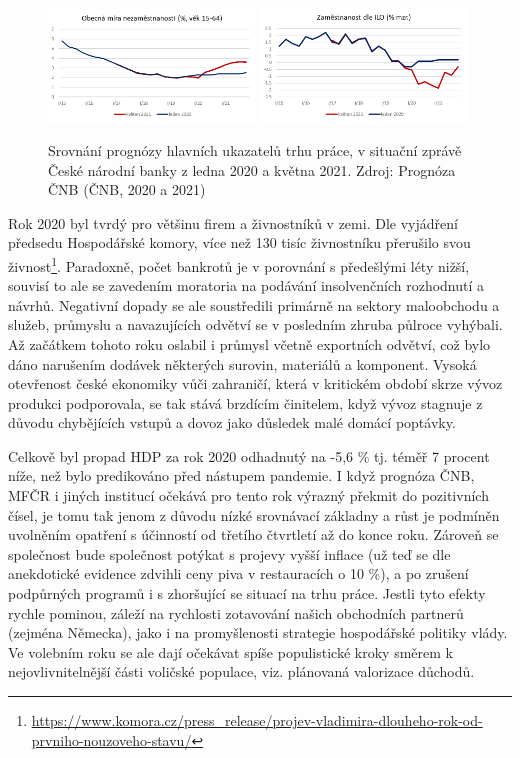 \begin{figure}[ht]
    \centering
    \includegraphics[width=0.49\textwidth]{./pic/nezamestnanost.png} \includegraphics[width=0.49\textwidth]{./pic/zamestnanost.png}
    \caption{Srovnání prognózy hlavních ukazatelů trhu práce, v situační zprávě České národní banky z ledna 2020 a května 2021. Zdroj: Prognóza ČNB (ČNB, 2020 a 2021)}
    \label{fig:110-trhprace}
\end{figure}

Rok 2020 byl tvrdý pro většinu firem a živnostníků v zemi. Dle vyjádření předsedu Hospodářské komory, více než 130 tisíc živnostníku přerušilo svou živnost\footnote{\url{https://www.komora.cz/press_release/projev-vladimira-dlouheho-rok-od-prvniho-nouzoveho-stavu/}}. Paradoxně, počet bankrotů je v porovnání s předešlými léty nižší, souvisí to ale se zavedením moratoria na podávání insolvenčních rozhodnutí a návrhů. Negativní dopady se ale soustředili primárně na sektory maloobchodu a služeb, průmyslu a navazujících odvětví se v posledním zhruba půlroce vyhýbali. Až začátkem tohoto roku oslabil i průmysl včetně exportních odvětví, což bylo dáno narušením dodávek některých surovin, materiálů a komponent. Vysoká otevřenost české ekonomiky vůči zahraničí, která v kritickém období skrze vývoz produkci podporovala, se tak stává brzdícím činitelem, když vývoz stagnuje z důvodu chybějících vstupů a dovoz jako důsledek malé domácí poptávky.

Celkově byl propad HDP za rok 2020 odhadnutý na -5,6 \% tj. téměř 7 procent níže, než bylo predikováno před nástupem pandemie. I když prognóza ČNB, MFČR i jiných institucí očekává pro tento rok výrazný překmit do pozitivních čísel, je tomu tak jenom z důvodu nízké srovnávací základny a růst je podmíněn uvolněním opatření s účinností od třetího čtvrtletí až do konce roku. Zároveň se společnost bude společnost potýkat s projevy vyšší inflace (už teď se dle anekdotické evidence zdvihli ceny piva v restauracích o 10 \%), a po zrušení podpůrných programů i s zhoršující se situací na trhu práce. Jestli tyto efekty rychle pominou, záleží na rychlosti zotavování našich obchodních partnerů (zejména Německa), jako i na promyšlenosti strategie hospodářské politiky vlády. Ve volebním roku se ale dají očekávat spíše populistické kroky směrem k nejovlivnitelnější části voličské populace, viz. plánovaná valorizace důchodů.

